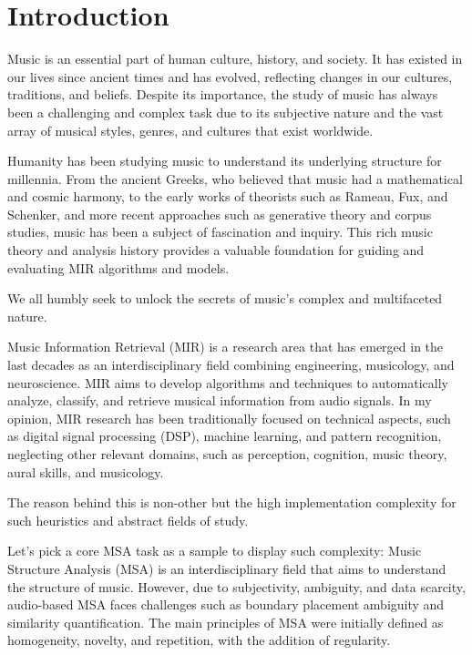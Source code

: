 \chapter{Introduction}

Music is an essential part of human culture, history, and society. It has existed in our lives since ancient times and has evolved, reflecting changes in our cultures, traditions, and beliefs. Despite its importance, the study of music has always been a challenging and complex task due to its subjective nature and the vast array of musical styles, genres, and cultures that exist worldwide.

Humanity has been studying music to understand its underlying structure for millennia. From the ancient Greeks, who believed that music had a mathematical and cosmic harmony, to the early works of theorists such as Rameau, Fux, and Schenker, and more recent approaches such as generative theory and corpus studies, music has been a subject of fascination and inquiry. This rich music theory and analysis history provides a valuable foundation for guiding and evaluating MIR algorithms and models. 

We all humbly seek to unlock the secrets of music's complex and multifaceted nature.

Music Information Retrieval (MIR) is a research area that has emerged in the last decades as an interdisciplinary field combining engineering, musicology, and neuroscience. MIR aims to develop algorithms and techniques to automatically analyze, classify, and retrieve musical information from audio signals. In my opinion, MIR research has been traditionally focused on technical aspects, such as digital signal processing (DSP), machine learning, and pattern recognition, neglecting other relevant domains, such as perception, cognition, music theory, aural skills, and musicology.

The reason behind this is non-other but the high implementation complexity for such heuristics and abstract fields of study.

Let's pick a core MSA task as a sample to display such complexity: Music Structure Analysis (MSA) is an interdisciplinary field that aims to understand the structure of music. However, due to subjectivity, ambiguity, and data scarcity, audio-based MSA faces challenges such as boundary placement ambiguity and similarity quantification. The main principles of MSA were initially defined as homogeneity, novelty, and repetition, with the addition of regularity.

